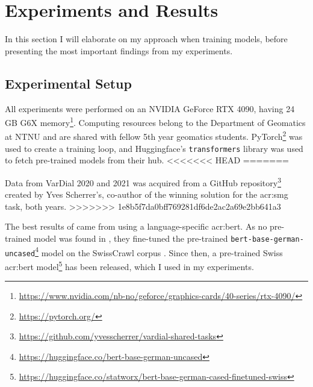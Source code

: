 \section{Experiments and Results}
\label{sec:Experiments}

\begin{comment}
Trying and failing is a major part of research.
However, to have a chance of success you need a plan driving the experimental research.
So first decide what experiments or series of experiments you plan --- and describe them in this section.
\end{comment}

In this section I will elaborate on my approach when training models, before presenting the most important findings from my experiments.

\subsection{Experimental Setup}
\label{sec:experimentalSetup}


All experiments were performed on an NVIDIA GeForce RTX 4090, having 24 GB G6X memory\footnote{\url{https://www.nvidia.com/nb-no/geforce/graphics-cards/40-series/rtx-4090/}}. Computing resources belong to the Department of Geomatics at NTNU and are shared with fellow 5th year geomatics students. PyTorch\footnote{\url{https://pytorch.org/}} was used to create a training loop, and Huggingface's \texttt{transformers} library was used to fetch pre-trained models from their hub.
<<<<<<< HEAD
=======

Data from VarDial 2020 and 2021 was acquired from a GitHub repository\footnote{\url{https://github.com/yvesscherrer/vardial-shared-tasks}} created by Yves Scherrer's, co-author of the winning solution for the \gls{acr:smg} task, both years.
>>>>>>> 1e8b5f7da0bff769281df6de2ac2a69e2bb641a3

The best results of \cite{scherrerHeLjuVarDial20202020} came from using a language-specific \acrshort{acr:bert}. As no pre-trained model was found in \citeyear{scherrerHeLjuVarDial20202020}, they fine-tuned the pre-trained \texttt{bert-base-german-uncased}\footnote{\url{https://huggingface.co/bert-base-german-uncased}} model on the SwissCrawl corpus \citep[3-4]{scherrerHeLjuVarDial20202020}. Since then, a pre-trained Swiss \acrshort{acr:bert} model\footnote{\url{https://huggingface.co/statworx/bert-base-german-cased-finetuned-swiss}} has been released, which I used in my experiments.

